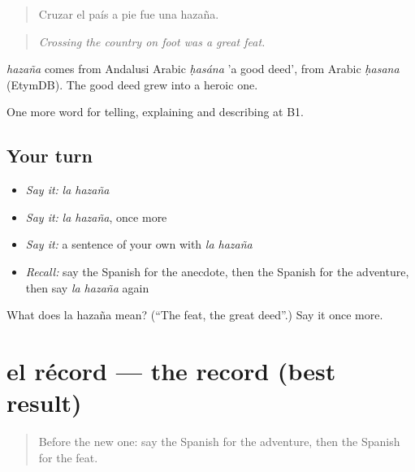 \begin{quote}
Cruzar el país a pie fue una hazaña.
\end{quote}

\begin{quote}
\emph{Crossing the country on foot was a great feat.}
\end{quote}

\begin{cousinweb}
\emph{hazaña} comes from Andalusi Arabic \emph{ḥasána} 'a good deed', from Arabic \emph{ḥasana} (EtymDB). The good deed grew into a heroic one.
\end{cousinweb}

\begin{grammarlens}[title={What you've built}]
One more word for telling, explaining and describing at B1.
\end{grammarlens}

\subsection*{Your turn}
\begin{itemize}
\raggedright
  \item \emph{Say it:} \emph{la hazaña}
  \item \emph{Say it:} \emph{la hazaña}, once more
  \item \emph{Say it:} a sentence of your own with \emph{la hazaña}
  \item \emph{Recall:} say the Spanish for the anecdote, then the Spanish for the adventure, then say \emph{la hazaña} again
\end{itemize}

\begin{tcolorbox}[breakable,colback=teal!4,colframe=teal!35!black,title={Before you move on}]
What does la hazaña mean? (\textquotedblleft{}The feat, the great deed\textquotedblright{}.) Say it once more.
\end{tcolorbox}
\section[el récord]{el récord — the record (best result)}

\label{lesson:ES-C566-record}



\begin{quote}
Before the new one: say the Spanish for the adventure, then the Spanish for the feat.
\end{quote}

